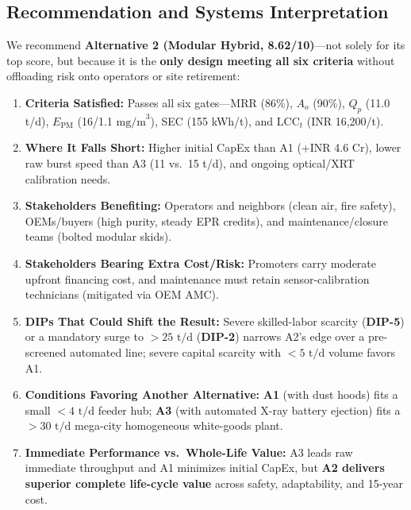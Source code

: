 \subsection{Recommendation and Systems Interpretation}
We recommend \textbf{Alternative 2 (Modular Hybrid, 8.62/10)}---not solely for its top score, but because it is the \textbf{only design meeting all six criteria} without offloading risk onto operators or site retirement:
\begin{enumerate}
    \item \textbf{Criteria Satisfied:} Passes all six gates---MRR (86\%), $A_o$ (90\%), $Q_p$ (11.0 t/d), $E_{\text{PM}}$ (16/1.1 $\text{mg/m}^3$), SEC (155 kWh/t), and $\text{LCC}_t$ (INR 16,200/t).
    \item \textbf{Where It Falls Short:} Higher initial CapEx than A1 (+INR 4.6 Cr), lower raw burst speed than A3 (11 vs.\ 15 t/d), and ongoing optical/XRT calibration needs.
    \item \textbf{Stakeholders Benefiting:} Operators and neighbors (clean air, fire safety), OEMs/buyers (high purity, steady EPR credits), and maintenance/closure teams (bolted modular skids).
    \item \textbf{Stakeholders Bearing Extra Cost/Risk:} Promoters carry moderate upfront financing cost, and maintenance must retain sensor-calibration technicians (mitigated via OEM AMC).
    \item \textbf{DIPs That Could Shift the Result:} Severe skilled-labor scarcity (\textbf{DIP-5}) or a mandatory surge to $>25\text{ t/d}$ (\textbf{DIP-2}) narrows A2's edge over a pre-screened automated line; severe capital scarcity with $<5\text{ t/d}$ volume favors A1.
    \item \textbf{Conditions Favoring Another Alternative:} \textbf{A1} (with dust hoods) fits a small $<4\text{ t/d}$ feeder hub; \textbf{A3} (with automated X-ray battery ejection) fits a $>30\text{ t/d}$ mega-city homogeneous white-goods plant.
    \item \textbf{Immediate Performance vs.\ Whole-Life Value:} A3 leads raw immediate throughput and A1 minimizes initial CapEx, but \textbf{A2 delivers superior complete life-cycle value} across safety, adaptability, and 15-year cost.
\end{enumerate}
